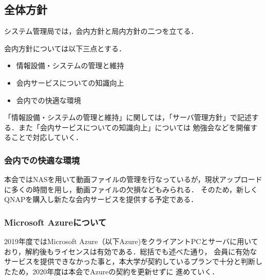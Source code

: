 \subsection*{全体方針}


システム管理局では，会内方針と局内方針の二つを立てる．

会内方針については以下三点とする．
\begin{itemize}
    \item 情報設備・システムの管理と維持
    \item 会内サービスについての知識向上
    \item 会内での快適な環境
  \end{itemize}

「情報設備・システムの管理と維持」に関しては，「サーバ管理方針」で記述する．また「会内サービスについての知識向上」については
勉強会などを開催することで対応していく．
\subsubsection*{会内での快適な環境}
本会ではNASを用いて動画ファイルの管理を行なっているが，現状アップロードに多くの時間を用し，動画ファイルの欠損などもみられる．
そのため，新しくQNAPを購入し新たな会内サービスを提供する予定である．

\subsubsection*{Microsoft Azureについて}
2019年度ではMicrosoft Azure（以下Azure)をクライアントPCとサーバに用いており，解約後もライセンスは有効である．総括でも述べた通り，
会員に有効なサービスを提供できなかった事と，本大学が契約しているプランで十分と判断したため，2020年度は本会でAzureの契約を更新せずに
進めていく．



  
